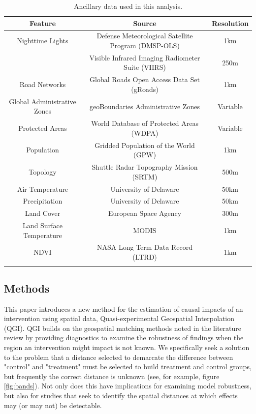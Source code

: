 \documentclass[sustainability,article,submit,moreauthors,pdftex]{Definitions/mdpi}
\begin{document}
\begin{table}[H]
\caption{Ancillary data used in this analysis.}
\begin{tabular}{ccc}
\toprule
\textbf{Feature}	& \textbf{Source}	& \textbf{Resolution}\\
\midrule
Nighttime Lights&Defense Meteorological Satellite Program (DMSP-OLS) \cite{dmsp}			& 1km\\
&Visible Infrared Imaging Radiometer Suite (VIIRS) \cite{viirs} & 250m\\
Road Networks & Global Roads Open Access Data Set (gRoads) \cite{groadsv1} & 1km\\
Global Administrative Zones & geoBoundaries Administrative Zones\cite{geoboundaries}  & Variable \\
Protected Areas & World Database of Protected Areas (WDPA) \cite{wdpa} & Variable\\
Population & Gridded Population of the World (GPW) \cite{gpwv3count, gpwv4count} & 1km\\
Topology & Shuttle Radar Topography Mission (SRTM) \cite{nasasrtm}&500m\\
Air Temperature&University of Delaware \cite{udeltemp2014}&50km\\
Precipitation&University of Delaware\cite{udelprecip2014}&50km\\
Land Cover&European Space Agency\cite{esaland}&300m\\
Land Surface Temperature&MODIS\cite{modis}&1km\\
NDVI & NASA Long Term Data Record (LTRD)\cite{ltdr}&1km\\

\bottomrule
\label{table:data}
\end{tabular}
\end{table}

\subsection{Methods}\label{sub:methods}
This paper introduces a new method for the estimation of causal impacts of an intervention using spatial data, Quasi-experimental Geospatial Interpolation (QGI).  QGI builds on the geospatial matching methods noted in the literature review by providing diagnostics to examine the robustness of findings when the region an intervention might impact is not known.  We specifically seek a solution to the problem that a distance selected to demarcate the difference between "control" and "treatment" must be selected to build treatment and control groups, but frequently the correct distance is unknown (see, for example, figure \ref{fig:bands}).  Not only does this have implications for examining model robustness, but also for studies that seek to identify the spatial distances at which effects may (or may not) be detectable.
\end{document}
